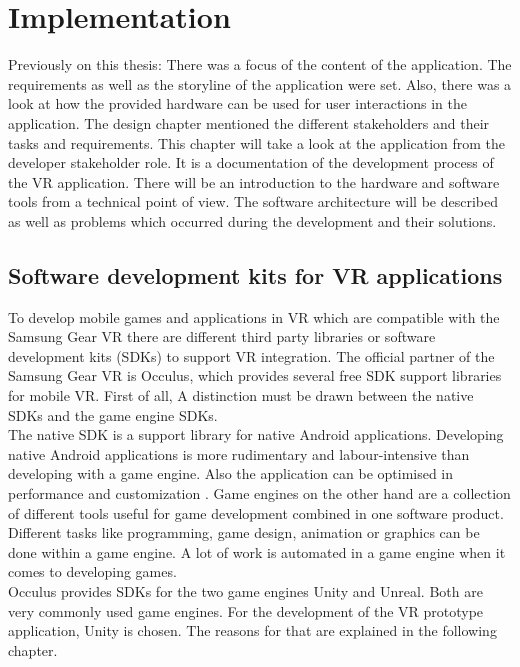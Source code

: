 \chapter{Implementation}
Previously on this thesis: There was a focus of the content of the application. The requirements as well as the storyline of the application were set. Also, there was a look at how the provided hardware can be used for user interactions in the application. The design chapter mentioned the different stakeholders and their tasks and requirements. This chapter will take a look at the application from the developer stakeholder role. It is a documentation of the development process of the VR application. There will be an introduction to the hardware and software tools from a technical point of view. The software architecture will be described as well as problems which occurred during the development and their solutions.

\section{Software development kits for VR applications}
To develop mobile games and applications in VR which are compatible with the Samsung Gear VR there are different third party libraries or software development kits (SDKs) to support VR integration. The official partner of the Samsung Gear VR is Occulus, which provides several free SDK support libraries for mobile VR. First of all, A distinction must be drawn between the native SDKs and the game engine SDKs.\\
The native SDK is a support library for native Android applications. Developing native Android applications is more rudimentary and labour-intensive than developing with a game engine. Also the application can be optimised in performance and customization \cite{Occulus.2019}. Game engines on the other hand are a collection of different tools useful for game development combined in one software product. Different tasks like programming, game design, animation or graphics can be done within a game engine. A lot of work is automated in a game engine when it comes to developing games. \cite{?}\\
Occulus provides SDKs for the two game engines Unity and Unreal. Both are very commonly used game engines. For the development of the VR prototype application, Unity is chosen. The reasons for that are explained in the following chapter.

